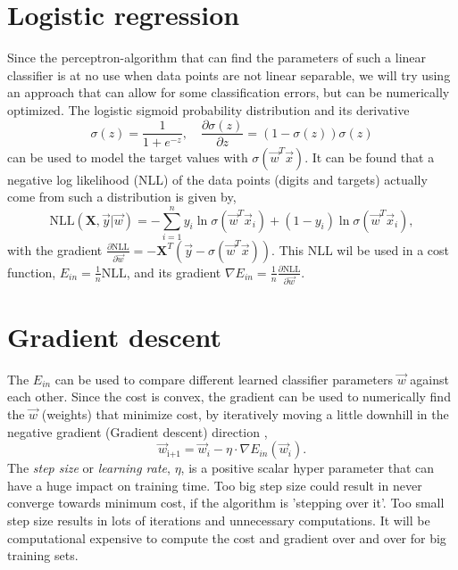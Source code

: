 \documentclass[a4paper,10pt,article,oneside,english]{memoir}
\begin{document}
\section{Logistic regression}
Since the perceptron-algorithm that can find the parameters of such a linear classifier is at no use when data points are not linear separable, we will try using an approach that can allow for some classification errors, but can be numerically optimized. The logistic sigmoid probability distribution and its derivative 
\begin{equation*}
\sigma(z) = \frac{1}{1+ e^{-z}}, \quad \frac{\partial \sigma(z)}{\partial z} = (1 - \sigma(z))\sigma(z)
\end{equation*}
can be used to model the target values with $\sigma(\vec{w}^T \vec{x})$. It can be found that a negative log likelihood (NLL) of the data points (digits and targets) actually come from such a distribution is given by,
\begin{equation*}
\text{NLL}(\mathbf{X},\vec{y}|\vec{w}) = - \sum_{i=1}^n y_i \ln\sigma(\vec{w}^T \vec{x}_i) + (1 - y_i)\ln\sigma(\vec{w}^T \vec{x}_i),
\end{equation*}
with the gradient 
$\frac{\partial \text{NLL}}{\partial \vec{w}}= - \mathbf{X}^T(\vec{y} - \sigma(\vec{w}^T \vec{x}))$. This NLL wil be used in a cost function, $E_{in} = \frac{1}{n}\text{NLL}$, and its gradient $\nabla E_{in} = \frac{1}{n}\frac{\partial \text{NLL}}{\partial \vec{w}}$. 



\section{Gradient descent}
The $E_{in}$ can be used to compare different learned classifier parameters $\vec{w}$ against each other. Since the cost is convex, the gradient can be used to numerically find the $\vec{w}$ (weights) that minimize cost, by iteratively moving a little downhill in the negative gradient (Gradient descent) direction ,
\begin{equation}
\vec{w}_\text{i+1} = \vec{w}_i -\eta \cdot \nabla E_{in}(\vec{w}_i).
\end{equation}
The \emph{step size} or \emph{learning rate}, $\eta$, is a positive scalar hyper parameter that can have a huge impact on training time. Too big step size could result in never converge towards minimum cost, if the algorithm is 'stepping over it'. Too small step size results in lots of iterations and unnecessary computations. It will be computational expensive to compute the cost and gradient over and over for big training sets.
\end{document}
